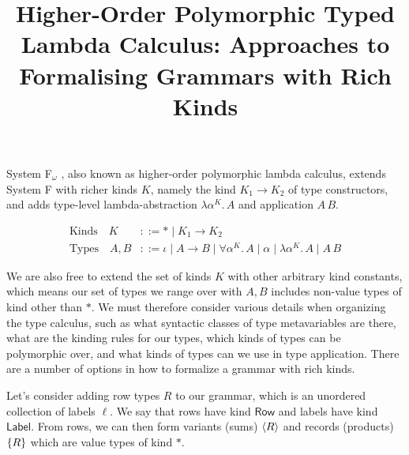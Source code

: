 \documentclass[acmsmall, 9pt]{article}
\begin{document}
\pagestyle{empty}

\title{Higher-Order Polymorphic Typed Lambda Calculus: Approaches to Formalising Grammars with Rich Kinds}

\maketitle
\noindent
System F$_\omega$ \cite{cambridge-lambda-calc, pierce2002types}, also known as higher-order polymorphic lambda calculus, extends System F with richer kinds $K$, namely the kind $K_1 \rightarrow K_2$ of type constructors, and adds type-level lambda-abstraction $\lambda \alpha^K. \, A$ and application $A\,B$.

\begin{align*}
  \text{Kinds} \quad K &::= * \; | \; K_1 \rightarrow K_2\\
  \text{Types} \quad  A, B &::= \iota \; | \;  A \rightarrow B \; | \; \forall \alpha^K . \, A\; | \; \alpha \; | \; \lambda \alpha^K. \, A \; | \; A \, B
\end{align*}

We are also free to extend the set of kinds $K$ with other arbitrary kind constants, which means our set of types we range over with $A, B$ includes non-value types of kind other than $*$. We must therefore consider various details when organizing the type calculus, such as what syntactic classes of type metavariables are there, what are the kinding rules for our types, which kinds of types can be polymorphic over, and what kinds of types can we use in type application. There are a number of options in how to formalize a grammar with rich kinds.

Let's consider adding row types $R$ to our grammar, which is an unordered collection of labels $\ell$. We say that rows have kind $\mathsf{Row}$ and labels have kind $\mathsf{Label}$. From rows, we can then form variants (sums) $\langle R \rangle$ and records (products) $\{ R \}$ which are value types of kind $*$.
\end{document}
